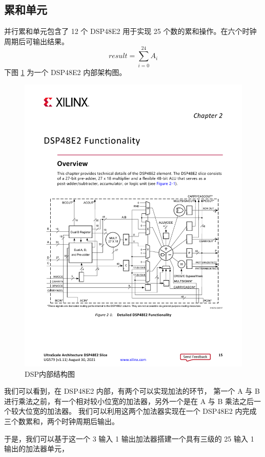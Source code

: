 \documentclass[12pt, a4paper, oneside]{ctexbook}
\begin{document}
	\subsection{累和单元}
	并行累和单元包含了 12 个 DSP48E2 用于实现 25 个数的累和操作。在六个时钟周期后可输出结果。
	\begin{equation} \label{sum}
		result = \sum_{i=0}^{24}A_i
	\end{equation}
	下图 \ref{DSP} 为一个 DSP48E2 内部架构图。
		\begin{figure}[h]
		\centering
		\includegraphics[scale=0.87]{pic/DSP}
		\caption{DSP内部结构图}
		\label{DSP}
		\end{figure}
	\par 我们可以看到，在 DSP48E2 内部，有两个可以实现加法的环节，
	第一个 A 与 B 进行乘法之前，有一个相对较小位宽的加法器，另外一个是在 A 与 B 乘法之后一个较大位宽的加法器。
	我们可以利用这两个加法器实现在一个 DSP48E2 内完成三个数累和，两个时钟周期后输出。
	\par 于是，我们可以基于这一个 3 输入 1 输出加法器搭建一个具有三级的 25 输入 1 输出的加法器单元，
\end{document}

